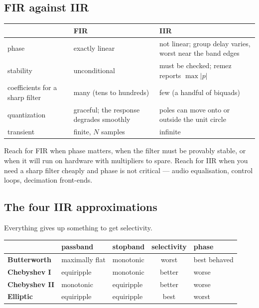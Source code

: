 \documentclass[11pt,a4paper]{article}
\begin{document}
\subsection{FIR against IIR}

\begin{center}
\begin{tabularx}{\textwidth}{@{}lYY@{}}
  \toprule
  & \textbf{FIR} & \textbf{IIR} \\
  \midrule
  phase & exactly linear & not linear; group delay varies, worst near the band
    edges \\
  \addlinespace
  stability & unconditional & must be checked; remez reports
    $\max|p|$ \\
  \addlinespace
  coefficients for a sharp filter & many (tens to hundreds) & few (a handful of
    biquads) \\
  \addlinespace
  quantization & graceful; the response degrades smoothly & poles can move onto
    or outside the unit circle \\
  \addlinespace
  transient & finite, $N$ samples & infinite \\
  \bottomrule
\end{tabularx}
\end{center}

Reach for FIR when phase matters, when the filter must be provably stable, or
when it will run on hardware with multipliers to spare. Reach for IIR when you
need a sharp filter cheaply and phase is not critical --- audio equalisation,
control loops, decimation front-ends.

\subsection{The four IIR approximations}
\label{sec:approximations}

Everything gives up something to get selectivity.

\begin{center}
\begin{tabular}{@{}lllcl@{}}
  \toprule
  & \textbf{passband} & \textbf{stopband} &
  \textbf{selectivity} & \textbf{phase} \\
  \midrule
  \textbf{Butterworth}  & maximally flat & monotonic  & worst  & best behaved \\
  \textbf{Chebyshev I}  & equiripple     & monotonic  & better & worse \\
  \textbf{Chebyshev II} & monotonic      & equiripple & better & worse \\
  \textbf{Elliptic}     & equiripple     & equiripple & best   & worst \\
  \bottomrule
\end{tabular}
\end{center}
\end{document}
